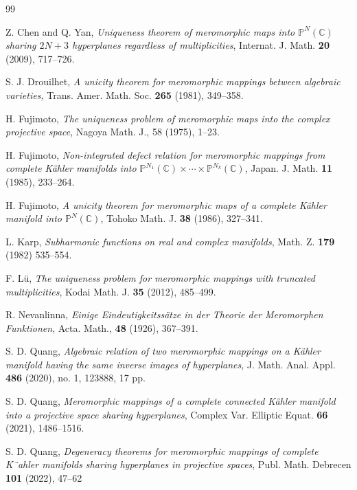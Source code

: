 \documentclass[12pt, a4paper, oneside]{amsart}
\newcommand{\C}{{\mathbb{C}}}
\renewcommand{\P}{{\mathbb{P}}}
\numberwithin{equation}{section}
\begin{document}
\begin{thebibliography}{99}

 Z. Chen and Q. Yan, \textit{Uniqueness theorem of meromorphic maps into $\P^N(\C)$ sharing $2N+3$ hyperplanes regardless of multiplicities}, Internat. J. Math. \textbf{20} (2009), 717--726.

 S. J. Drouilhet, \textit{A unicity theorem for meromorphic mappings between algebraic varieties,} Trans. Amer. Math. Soc. \textbf{265} (1981), 349--358.

 H. Fujimoto,  \textit{The uniqueness problem of meromorphic maps into the complex projective space}, Nagoya Math. J., {58} (1975), 1--23.

 H. Fujimoto, \textit{Non-integrated defect relation for meromorphic mappings from complete K\"{a}hler manifolds into $\P^{N_1}(\C)\times\cdots\times\P^{N_k}(\C)$}, Japan. J. Math. \textbf{11} (1985), 233--264.

 H. Fujimoto, \textit{A unicity theorem for meromorphic maps of a complete K\"{a}hler manifold into $\P^N(\C)$}, Tohoko Math. J. \textbf{38} (1986), 327--341.


 L. Karp, \textit{Subharmonic functions on real and complex manifolds}, Math. Z. \textbf{179} (1982) 535--554. 

 F. L\"{u}, \textit{The uniqueness problem for meromorphic mappings with truncated multiplicities}, Kodai Math. J. \textbf{35} (2012), 485--499.

 R. Nevanlinna, \textit{Einige Eindeutigkeitss\"atze in der Theorie der Meromorphen Funktionen}, Acta. Math.,
\textbf{48} (1926), 367--391.

 S. D. Quang, \textit{Algebraic relation of two meromorphic mappings on a K\"{a}hler manifold having the same inverse images of hyperplanes}, J. Math. Anal. Appl. \textbf{486} (2020), no. 1, 123888, 17 pp.

 S. D. Quang, \textit{Meromorphic mappings of a complete connected K\"{a}hler manifold into a projective space sharing hyperplanes}, Complex Var. Elliptic Equat. \textbf{66} (2021), 1486--1516.

 S. D. Quang, \textit{Degeneracy theorems for meromorphic mappings of complete K¨ahler manifolds sharing hyperplanes in projective spaces}, Publ. Math. Debrecen \textbf{101} (2022), 47--62


\end{thebibliography}
\end{document}
